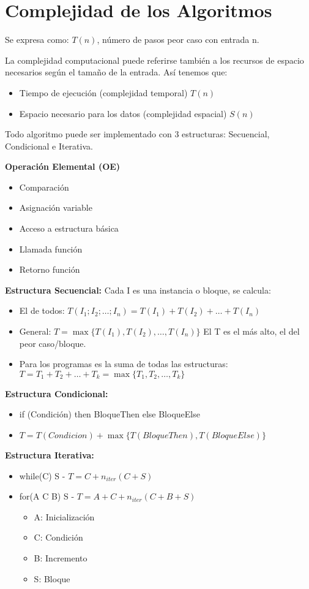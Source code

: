\section{Complejidad de los Algoritmos}\label{sec:complejidad-de-los-algoritmos}
Se expresa como: $T(n)$, número de pasos peor caso con entrada n.

La complejidad computacional puede referirse también a los recursos de espacio necesarios según el tamaño de la entrada. Así tenemos que:
\begin{itemize}
  \item Tiempo de ejecución (complejidad temporal) $T(n)$
  \item Espacio necesario para los datos (complejidad espacial) $S(n)$
\end{itemize}

Todo algoritmo puede ser implementado con 3 estructuras: Secuencial, Condicional e Iterativa.

\textbf{Operación Elemental (OE)}
\begin{itemize}
  \item Comparación
  \item Asignación variable
  \item Acceso a estructura básica
  \item Llamada función
  \item Retorno función
\end{itemize}

\textbf{Estructura Secuencial:} Cada I es una instancia o bloque, se calcula:
\begin{itemize}
  \item El de todos: $T(I_1; I_2; \dots; I_n) = T(I_1) + T(I_2) + \dots + T(I_n)$
  \item General: $T= \max \{T(I_1), T(I_2), \dots, T(I_n)\}$ El T es el más alto, el del peor caso/bloque.
  \item Para los programas es la suma de todas las estructuras: $T = T_1 + T_2 + \dots + T_k = \max \{ T_1, T_2, \dots, T_k \}$
\end{itemize}

\textbf{Estructura Condicional:}
\begin{itemize}
  \item if (Condición) then BloqueThen else BloqueElse
  \item $T = T(Condicion) + \max \{T(BloqueThen), T(BloqueElse)\}$
\end{itemize}

\textbf{Estructura Iterativa:}
\begin{itemize}
  \item while(C) S - $T = C + n_{iter} (C+S)$
  \item for(A C B) S - $T = A + C + n_{iter} (C+B+S)$
  \begin{itemize}
    \item A: Inicialización
    \item C: Condición
    \item B: Incremento
    \item S: Bloque
  \end{itemize}
\end{itemize}
\pagebreak

